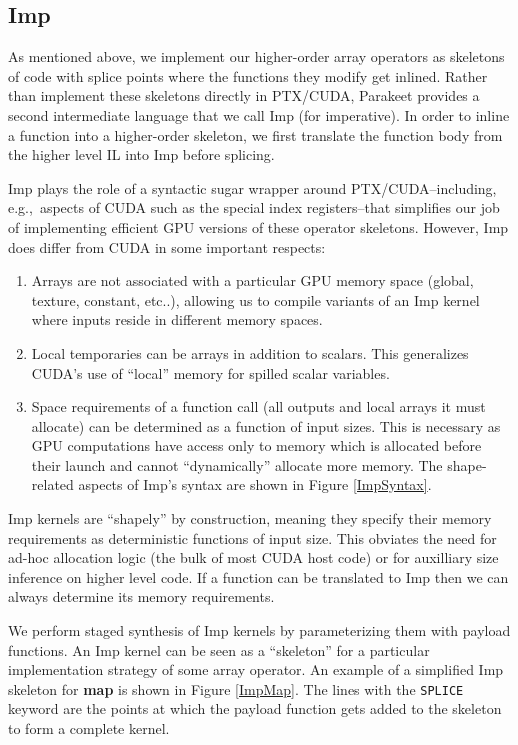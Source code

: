\documentclass[preprint]{sigplanconf}
\begin{document}
\subsection{Imp}
\label{Imp}

As mentioned above, we implement our higher-order array operators as skeletons
of code with splice points where the functions they modify get inlined.  Rather
than implement these skeletons directly in PTX/CUDA, Parakeet
provides a second intermediate language that we call Imp (for imperative).  In
order to inline a function into a higher-order skeleton, we first translate the
function body from the higher level IL into Imp before splicing.

Imp plays the role of a syntactic sugar wrapper around
PTX/CUDA--including, e.g.,~aspects of CUDA such as the special index
registers--that simplifies our job of implementing efficient GPU versions of
these operator skeletons. However, Imp does differ from CUDA in some important
respects:

\begin{enumerate}
\item  Arrays are not associated with a particular GPU memory space (global,
texture, constant, etc..), allowing us to compile variants of an Imp kernel
where inputs reside in different memory spaces.

\item Local temporaries can be arrays in addition to scalars. This generalizes
CUDA's use of ``local'' memory for spilled scalar variables.

\item Space requirements of a function call (all outputs and local arrays it
must allocate) can be determined as a function of input sizes. This is necessary
as GPU computations have access only to memory which is allocated before their
launch and cannot ``dynamically'' allocate more memory.  The shape-related
aspects of Imp's syntax are shown in Figure \ref{ImpSyntax}.
\end{enumerate}
Imp kernels are ``shapely'' by construction, meaning they specify their memory
requirements as deterministic functions of input size. This obviates the
need for ad-hoc allocation logic (the bulk of most CUDA host code) or for
auxilliary size inference on higher level code. If a function can be translated
to Imp then we can always determine its memory requirements.

We perform staged synthesis of Imp kernels by parameterizing them with payload
functions. An Imp kernel can be seen as a ``skeleton'' \cite{Cole04} for a
particular implementation strategy of some array operator.  An example of a
simplified Imp skeleton for \textbf{map} is shown in Figure \ref{ImpMap}.  The
lines with the \texttt{SPLICE} keyword are the points at which the payload
function gets added to the skeleton to form a complete kernel.
\end{document}
